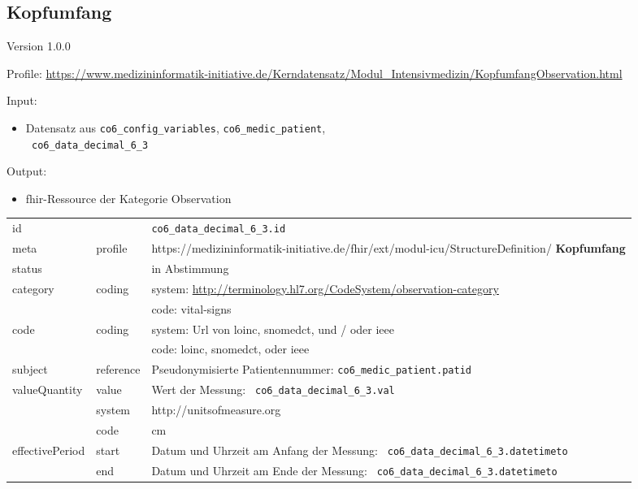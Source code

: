 \subsection{Kopfumfang} 
\noindent Version 1.0.0

\noindent Profile: \url{https://www.medizininformatik-initiative.de/Kerndatensatz/Modul_Intensivmedizin/KopfumfangObservation.html}

\noindent Input:
\begin{itemize}
	\item Datensatz aus \texttt{co6\_config\_variables}, \texttt{co6\_medic\_patient}, \\ \texttt{
co6\_data\_decimal\_6\_3}
\end{itemize}
Output:
\begin{itemize}
        \item \ac{fhir}-Ressource der Kategorie \glqq Observation\grqq{}
\end{itemize}
\begin{longtable}{|l|l|p{7.5cm}|}
        \hline
        \rowcolor{lightgray} \multicolumn{3}{|l|}{Data Mapping (inhaltlich)} \\ \hline
        id &  & \texttt{co6\_data\_decimal\_6\_3.id} \\ \hline
	meta & profile & https://medizininformatik-initiative.de/fhir/ext/modul-icu/StructureDefinition/\textbf{
Kopfumfang} \\ \hline 
	status &  & in Abstimmung  \\ \hline 
	category & coding & system: \url{http://terminology.hl7.org/CodeSystem/observation-category} \\
\cline{3-3}
	& & code: vital-signs \\ \hline
	code & coding & system: Url von \ac{loinc}, \ac{snomedct}, und / oder \ac{ieee} \\ 
	\cline{3-3} 
	 &  & code: \ac{loinc}, \ac{snomedct}, oder \ac{ieee} \\ \hline
	subject & reference & Pseudonymisierte Patientennummer: \texttt{co6\_medic\_patient.patid} \\ \hline
	valueQuantity & value & Wert der Messung: \texttt{
co6\_data\_decimal\_6\_3.val} \\
        \cline{2-3}
         & system & http://unitsofmeasure.org \\
         \cline{2-3}
         & code & cm \\ \hline
    effectivePeriod & start & Datum und Uhrzeit am Anfang der Messung: \texttt{
co6\_data\_decimal\_6\_3.datetimeto} \\
    \cline{2-3}
     & end & Datum und Uhrzeit am Ende der Messung: \texttt{
co6\_data\_decimal\_6\_3.datetimeto} \\ \hline
\end{longtable}


